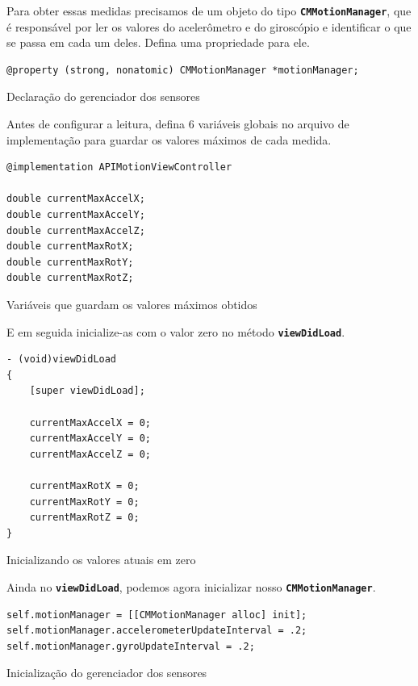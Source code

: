 \documentclass[a4paper,12pt,brazil,doubleside]{book}
\begin{document}
\begin{singlespace}
Para obter essas medidas precisamos de um objeto do tipo \texttt{\textbf{CMMotionManager}}, que é responsável por ler os valores do acelerômetro e do giroscópio e identificar o que se passa em cada um deles. Defina uma propriedade para ele.

\begin{listing}[H]
\begin{verbatim}
@property (strong, nonatomic) CMMotionManager *motionManager;
\end{verbatim}
\caption{Declaração do gerenciador dos sensores}
\end{listing}


Antes de configurar a leitura, defina 6 variáveis globais no arquivo de implementação para guardar os valores máximos de cada medida.

\begin{listing}[H]
\begin{verbatim}
@implementation APIMotionViewController

double currentMaxAccelX;
double currentMaxAccelY;
double currentMaxAccelZ;
double currentMaxRotX;
double currentMaxRotY;
double currentMaxRotZ;
\end{verbatim}
\caption{Variáveis que guardam os valores máximos obtidos}
\end{listing}


E em seguida inicialize-as com o valor zero no método \texttt{\textbf{viewDidLoad}}.

\begin{listing}[H]
\begin{verbatim}
- (void)viewDidLoad
{
    [super viewDidLoad];
    
    currentMaxAccelX = 0;
    currentMaxAccelY = 0;
    currentMaxAccelZ = 0;
    
    currentMaxRotX = 0;
    currentMaxRotY = 0;
    currentMaxRotZ = 0;
}
\end{verbatim}
\caption{Inicializando os valores atuais em zero}
\end{listing}


Ainda no \texttt{\textbf{viewDidLoad}}, podemos agora inicializar nosso \texttt{\textbf{CMMotionManager}}.

\begin{listing}[H]
\begin{verbatim}
self.motionManager = [[CMMotionManager alloc] init];
self.motionManager.accelerometerUpdateInterval = .2;
self.motionManager.gyroUpdateInterval = .2;
\end{verbatim}
\caption{Inicialização do gerenciador dos sensores}
\end{listing}



\end{singlespace}
\end{document}
